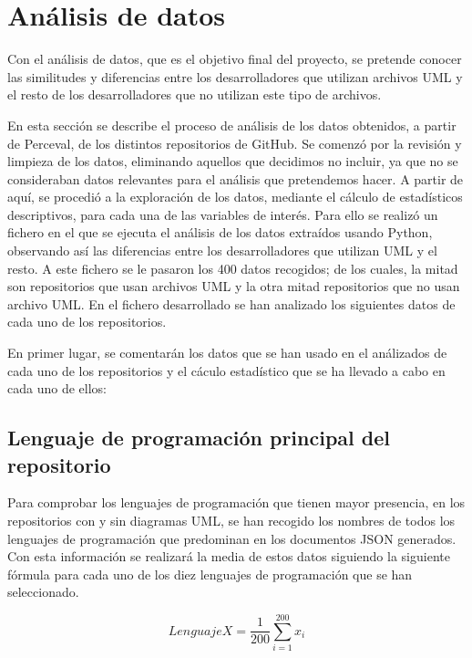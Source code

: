 \documentclass[a4paper, 12pt]{book}
\begin{document}
\section{Análisis de datos} %
\label{sec:análisis de datos}

Con el análisis de datos, que es el objetivo final del proyecto, se pretende conocer las similitudes y diferencias entre los desarrolladores que utilizan archivos UML y el resto de los desarrolladores que no utilizan este tipo de archivos.


En esta sección se describe el proceso de análisis de los datos obtenidos, a partir de Perceval, de los distintos repositorios de GitHub. 
Se comenzó por la revisión y limpieza de los datos, eliminando aquellos que decidimos no incluir, ya que no se consideraban datos relevantes para el análisis que pretendemos hacer. 
A partir de aquí, se procedió a la exploración de los datos, mediante el cálculo de estadísticos descriptivos, para cada una de las variables de interés. 
Para ello se realizó un fichero en el que se ejecuta el análisis de los datos extraídos usando Python, observando así las diferencias entre los desarrolladores que utilizan UML y el resto.
A este fichero se le pasaron los 400 datos recogidos; de los cuales, la mitad son repositorios que usan archivos UML y la otra mitad repositorios que no usan archivo UML. 
En el fichero desarrollado se han analizado los siguientes datos de cada uno de los repositorios. 


En primer lugar, se comentarán los datos que se han usado en el análizados de cada uno de los repositorios y el cáculo estadístico que se ha llevado a cabo en cada uno de ellos:


\subsection{Lenguaje de programación principal del repositorio} %
\label{sec:lenguaje de programación principal del repositorio}
Para comprobar los lenguajes de programación que tienen mayor presencia, en los repositorios con y sin diagramas UML, se han recogido los nombres de todos los lenguajes de programación que predominan en los documentos JSON generados.
Con esta información se realizará la media de estos datos siguiendo la siguiente fórmula para cada uno de los diez lenguajes de programación que se han seleccionado.


\[{Lenguaje X} = \frac{1}{200} \sum_{i=1}^{200} x_i\]
\end{document}
